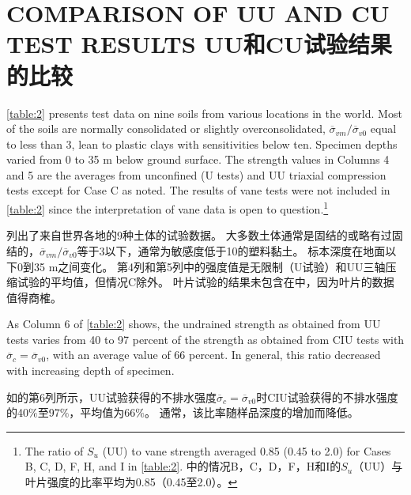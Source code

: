 \section{COMPARISON OF UU AND CU TEST RESULTS UU和CU试验结果的比较}

\begin{paracol}{2}
    
    \autoref{table:2} presents test data on nine soils from various locations in the world. Most of the soils are normally consolidated or slightly overconsolidated, $\overline{\sigma}_{vm}/\overline{\sigma}_{v0}$ equal to less than 3, lean to plastic clays with sensitivities below ten. Specimen depths varied from 0 to 35 m below ground surface. The strength values in Columns 4 and 5 are the averages from unconfined (U tests) and UU triaxial compression tests except for Case C as noted. The results of vane tests were not included in \autoref{table:2} since the interpretation of vane data is open to question.\footnote{
        The ratio of $S_u$ (UU) to vane strength averaged 0.85 (0.45 to 2.0) for Cases B, C, D, F, H, and I in \autoref{table:2}. 中的情况B，C，D，F，H和I的$S_u$（UU）与叶片强度的比率平均为0.85（0.45至2.0）。
    }

    \switchcolumn

    列出了来自世界各地的9种土体的试验数据。 大多数土体通常是固结的或略有过固结的，$\overline{\sigma}_{vm}/\overline{\sigma}_{v0}$等于3以下，通常为敏感度低于10的塑料黏土。 标本深度在地面以下0到35 m之间变化。 第4列和第5列中的强度值是无限制（U试验）和UU三轴压缩试验的平均值，但情况C除外。 叶片试验的结果未包含在中，因为叶片的数据值得商榷。

    \switchcolumn*

    As Column 6 of \autoref{table:2} shows, the undrained strength as obtained from UU tests varies from 40 to 97 percent of the strength as obtained from CIU tests with $\overline{\sigma}_c=\overline{\sigma}_{v0}$, with an average value of 66 percent. In general, this ratio decreased with increasing depth of specimen.

    \switchcolumn

    如的第6列所示，UU试验获得的不排水强度$\overline{\sigma}_c=\overline{\sigma}_{v0}$时CIU试验获得的不排水强度的40$\%$至97$\%$，平均值为66$\%$。 通常，该比率随样品深度的增加而降低。

    \switchcolumn*


\end{paracol}
